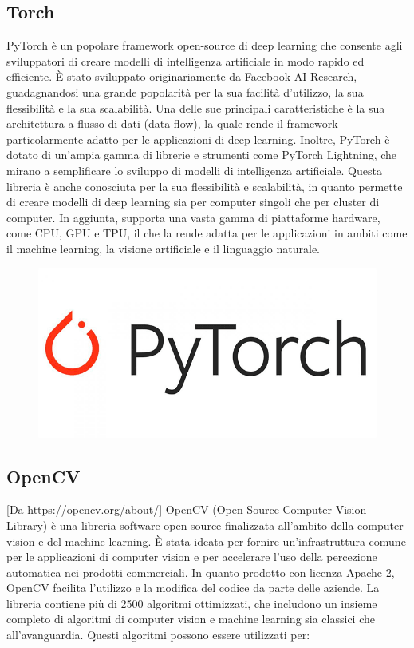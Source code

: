 \subsection{Torch}
PyTorch è un popolare framework open-source di deep learning che consente agli sviluppatori di creare modelli di intelligenza artificiale in modo rapido ed efficiente. È stato sviluppato originariamente da Facebook AI Research, guadagnandosi una grande popolarità per la sua facilità d'utilizzo, la sua flessibilità e la sua scalabilità.
Una delle sue principali caratteristiche è la sua architettura a flusso di dati (data flow), la quale rende il framework particolarmente adatto per le applicazioni di deep learning. 
Inoltre, PyTorch è dotato di un'ampia gamma di librerie e strumenti come PyTorch Lightning, che mirano a semplificare lo sviluppo di modelli di intelligenza artificiale.
Questa libreria è anche conosciuta per la sua flessibilità e scalabilità, in quanto permette di creare modelli di deep learning sia per computer singoli che per cluster di computer. 
In aggiunta, supporta una vasta gamma di piattaforme hardware, come CPU, GPU e TPU, il che la rende adatta per le applicazioni in ambiti come il machine learning, la visione artificiale e il linguaggio naturale.

\begin{figure}
    \begin{center}    
        \includegraphics[width=0.9\linewidth]{images/image7.png}
    \end{center}
\end{figure}

\subsection{OpenCV}
[Da https://opencv.org/about/]
OpenCV (Open Source Computer Vision Library) è una libreria software open source finalizzata all’ambito della computer vision e del machine learning. 
È stata ideata per fornire un'infrastruttura comune per le applicazioni di computer vision e per accelerare l'uso della percezione automatica nei prodotti commerciali. 
In quanto prodotto con licenza Apache 2, OpenCV facilita l'utilizzo e la modifica del codice da parte delle aziende.
La libreria contiene più di 2500 algoritmi ottimizzati, che includono un insieme completo di algoritmi di computer vision e machine learning sia classici che all'avanguardia. 
Questi algoritmi possono essere utilizzati per:

